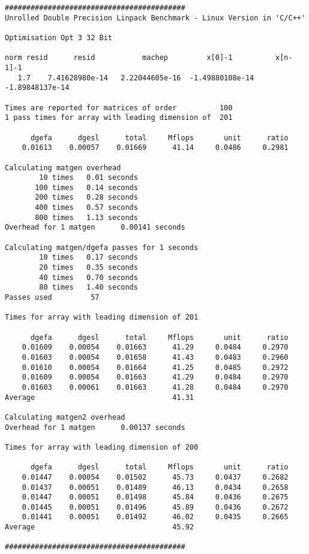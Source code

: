 \begin{verbatim}
##########################################
Unrolled Double Precision Linpack Benchmark - Linux Version in 'C/C++'

Optimisation Opt 3 32 Bit

norm resid      resid           machep         x[0]-1          x[n-1]-1
   1.7    7.41628980e-14   2.22044605e-16  -1.49880108e-14  -1.89848137e-14

Times are reported for matrices of order          100
1 pass times for array with leading dimension of  201

      dgefa      dgesl      total     Mflops       unit      ratio
    0.01613    0.00057    0.01669      41.14     0.0486     0.2981

Calculating matgen overhead
        10 times   0.01 seconds
       100 times   0.14 seconds
       200 times   0.28 seconds
       400 times   0.57 seconds
       800 times   1.13 seconds
Overhead for 1 matgen      0.00141 seconds

Calculating matgen/dgefa passes for 1 seconds
        10 times   0.17 seconds
        20 times   0.35 seconds
        40 times   0.70 seconds
        80 times   1.40 seconds
Passes used         57 

Times for array with leading dimension of 201

      dgefa      dgesl      total     Mflops       unit      ratio
    0.01609    0.00054    0.01663      41.29     0.0484     0.2970
    0.01603    0.00054    0.01658      41.43     0.0483     0.2960
    0.01610    0.00054    0.01664      41.25     0.0485     0.2972
    0.01609    0.00054    0.01663      41.29     0.0484     0.2970
    0.01603    0.00061    0.01663      41.28     0.0484     0.2970
Average                                41.31

Calculating matgen2 overhead
Overhead for 1 matgen      0.00137 seconds

Times for array with leading dimension of 200

      dgefa      dgesl      total     Mflops       unit      ratio
    0.01447    0.00054    0.01502      45.73     0.0437     0.2682
    0.01437    0.00051    0.01489      46.13     0.0434     0.2658
    0.01447    0.00051    0.01498      45.84     0.0436     0.2675
    0.01445    0.00051    0.01496      45.89     0.0436     0.2672
    0.01441    0.00051    0.01492      46.02     0.0435     0.2665
Average                                45.92

##########################################


\end{verbatim}
